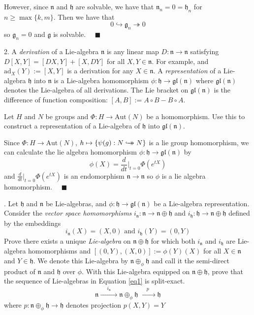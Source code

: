 \documentclass[12pt]{article}
\newcommand{\Aut}{\text{Aut}}
\newcommand{\lra}{\longrightarrow}
\newcommand{\gl}{\mathfrak{gl}}
\newcommand{\g}{\mathfrak{g}}
\newcommand{\h}{\mathfrak{h}}
\newcommand{\n}{\mathfrak{n}}
\newcommand{\ad}{\text{ad}}
\newcommand{\qed}{\quad \blacksquare}
\newcommand{\biject}{\hookrightarrow \hspace{-8pt} \rightarrow}
\begin{document}
        However, since $\n$ and $\h$ are solvable, we have that $\n_n = 0 = \h_n$ for $n \geq \max\{k, m\}$. Then we have that 
        \[0 \hookrightarrow \g_n \twoheadrightarrow 0\]
        so $\g_n = 0$ and $\g$ is solvable. $\qed$
    \color{black}


\pagebreak

2.  A \emph{derivation} of a Lie-algebra $\n$ is any linear map $D: \n \lra \n$ satisfying $D[X,Y] = [DX,Y] + [X,DY]$ for all $X,Y \in \n$.  For example, and $\ad_{X}(Y) := [X,Y]$ is a derivation for any $X \in \n$.  A \emph{representation} of a Lie-algebra $\h$ into $\n$ is a Lie-algebra homomorphism $\phi: \h \lra \gl(\n)$ where $\gl(\n)$ denotes the Lie-algebra of all derivations.  The Lie bracket on $\gl(\n)$ is the difference of function composition: $[A,B]:=A\circ B - B\circ A$.

Let $H$ and $N$ be groups and $\Phi: H \lra \Aut(N)$ be a homomorphism.  Use this to construct a representation of a Lie-algebra of $\h$ into $\gl(\n)$.  

    \color{blue}
        Since $\Phi: H \to \Aut(N)$, $h \mapsto \{\psi(g): N \biject N\}$ is a lie group homomorphism, we can calculate the lie algebra homomorphism $\phi: \h \to \gl(\n)$ by 
        \[\phi(X) = \frac{d}{dt}\bigg\vert_{t=0} \Phi(e^{tX})\]
        and $\frac{d}{dt}\bigg\vert_{t=0} \Phi(e^{tX})$ is an endomorphism $\n \to \n$ so $\phi$ is a lie algebra homomorphism. $\qed$

    \color{black}

.  Let $\h$ and $\n$ be Lie-algebras, and $\phi: \h \lra \gl(\n)$ be a Lie-algebra representation.  Consider the \emph{vector space homomorphisms} $i_{\n}: \n \lra \n \oplus \h$ and $i_{\h}: \h \lra \n\oplus \h$ defined by the embeddings 
\[i_{\n}(X) = (X,0) \text{ and } i_{\h}(Y) = (0,Y) \]
Prove there exists a unique \emph{Lie-algebra} on $\n\oplus \h$ for which both $i_{\n}$ and $i_{\h}$ are Lie-algebra homomorphisms and $[(0,Y),(X,0)] := \phi(Y)(X)$ for all $X \in \n$ and $Y \in \h$.  We denote this Lie-algebra by $\n \oplus_{\phi} \h$ and call it the semi-direct product of $\n$ and $\h$ over $\phi$.  With this Lie-algebra equipped on $\n\oplus \h$, prove that the sequence of Lie-algebras in Equation \ref{eq1} is split-exact.
\begin{equation}\label{eq1}
\n \xrightarrow{\phantom{=}i_{\n}\phantom{=}} \n\oplus_{\phi} \h \xrightarrow{\phantom{=}p\phantom{=}} \h
\end{equation}
where $p: \n\oplus_{\phi} \h \lra \h$ denotes projection $p(X,Y) = Y$
\end{document}
